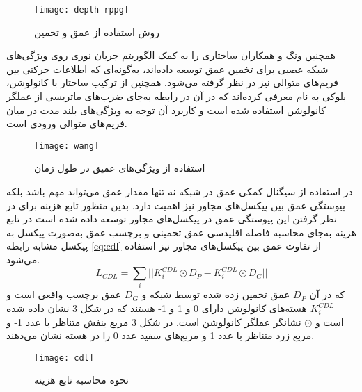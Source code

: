 \begin{figure}[t]
	\centerline{\texttt{[image: depth-rppg]}}
	\caption{روش استفاده از عمق و تخمین  \cite{liu2018learning}}
	\label{fig:depth-rppg}
\end{figure}

همچنین ونگ و همکاران
\cite{wang2018exploiting}
ساختاری را به کمک الگوریتم جریان نوری
 روی ویژگی‌های شبکه عصبی برای تخمین عمق توسعه داده‌اند، به‌گونه‌ای که اطلاعات حرکتی بین فریم‌های متوالی نیز در نظر گرفته می‌شود. همچنین از ترکیب ساختار
  \cite{cho2014learning}
با کانولوشن، بلوکی به نام  معرفی کرده‌اند که در آن در رابطه  به‌جای ضرب‌های ماتریسی از عملگر کانولوشن استفاده شده است و کاربرد آن توجه به ویژگی‌های بلند مدت در میان فریم‌های متوالی ورودی است.

\begin{figure}[h]
	\centerline{\texttt{[image: wang]}}
	\caption{استفاده از ویژگی‌های عمیق در طول زمان \cite{wang2018exploiting}}
	\label{fig:wang}
\end{figure}
در استفاده از سیگنال کمکی عمق در شبکه نه تنها مقدار عمق می‌تواند مهم باشد بلکه پیوستگی عمق بین پیکسل‌های مجاور نیز اهمیت دارد. بدین منظور تابع هزینه  برای در نظر گرفتن این پیوستگی عمق در پیکسل‌های مجاور توسعه داده شده است
\cite{wang2020deep,wang2018exploiting}
در تابع هزینه  به‌جای محاسبه فاصله اقلیدسی عمق تخمینی و برچسب عمق به‌صورت پیکسل به پیکسل مشابه رابطه
\ref{eq:cdl}
 از تفاوت عمق بین پیکسل‌های مجاور نیز استفاده می‌شود.
\begin{equation}\label{eq:cdl}
	L_{CDL} = \sum_{i}||K_i^{CDL} \odot D_P-K_i^{CDL} \odot D_G||
\end{equation}
که در آن
$D_P$
عمق تخمین زده شده توسط شبکه و
$D_G$
عمق برچسب واقعی است و
$K_i^{CDL}$
هسته‌های کانولوشن دارای 0 و 1 و 1- هستند که در شکل
\ref{fig:cdl}
نشان داده شده است و 
$\odot$
 نشانگر عملگر کانولوشن است. در شکل
\ref{fig:cdl}
مربع بنفش متناظر با عدد 1- و مربع زرد متناظر با عدد 1 و مربع‌های سفید عدد 0 را در هسته نشان می‌دهند. 
 \begin{figure}[h]
 	\centerline{\texttt{[image: cdl]}}
 	\caption{نحوه محاسبه تابع هزینه  \cite{yu2020searching}}
 	\label{fig:cdl}
 \end{figure}

